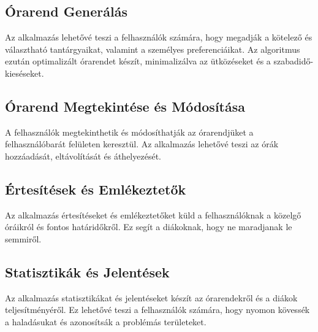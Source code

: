 \documentclass{article}
\begin{document}
\subsection{Órarend Generálás}
Az alkalmazás lehetővé teszi a felhasználók számára, hogy megadják a kötelező és választható tantárgyaikat, valamint a személyes preferenciáikat. Az algoritmus ezután optimalizált órarendet készít, minimalizálva az ütközéseket és a szabadidő-kieséseket.

\subsection{Órarend Megtekintése és Módosítása}
A felhasználók megtekinthetik és módosíthatják az órarendjüket a felhasználóbarát felületen keresztül. Az alkalmazás lehetővé teszi az órák hozzáadását, eltávolítását és áthelyezését.

\subsection{Értesítések és Emlékeztetők}
Az alkalmazás értesítéseket és emlékeztetőket küld a felhasználóknak a közelgő óráikról és fontos határidőkről. Ez segít a diákoknak, hogy ne maradjanak le semmiről.

\subsection{Statisztikák és Jelentések}
Az alkalmazás statisztikákat és jelentéseket készít az órarendekről és a diákok teljesítményéről. Ez lehetővé teszi a felhasználók számára, hogy nyomon kövessék a haladásukat és azonosítsák a problémás területeket.
\end{document}
